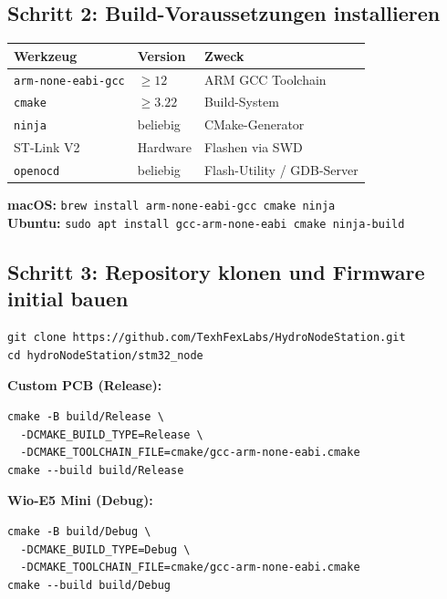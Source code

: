 \documentclass[11pt,a4paper]{scrartcl}
\begin{document}
\subsection*{Schritt 2: Build-Voraussetzungen installieren}

\begin{table}[H]
  \centering
  \begin{tabular}{lll}
    \hline
    \textbf{Werkzeug} & \textbf{Version} & \textbf{Zweck} \\
    \hline
    \texttt{arm-none-eabi-gcc} & $\geq 12$ & ARM GCC Toolchain \\
    \texttt{cmake}             & $\geq 3.22$ & Build-System \\
    \texttt{ninja}             & beliebig & CMake-Generator \\
    ST-Link V2                 & Hardware & Flashen via SWD \\
    \texttt{openocd}           & beliebig & Flash-Utility / GDB-Server \\
    \hline
  \end{tabular}
\end{table}

\textbf{macOS:} \quad\texttt{brew install arm-none-eabi-gcc cmake ninja}\\
\textbf{Ubuntu:} \quad\texttt{sudo apt install gcc-arm-none-eabi cmake ninja-build}

\subsection*{Schritt 3: Repository klonen und Firmware initial bauen}

\begin{verbatim}
git clone https://github.com/TexhFexLabs/HydroNodeStation.git
cd hydroNodeStation/stm32_node
\end{verbatim}

\textbf{Custom PCB (Release):}
\begin{verbatim}
cmake -B build/Release \
  -DCMAKE_BUILD_TYPE=Release \
  -DCMAKE_TOOLCHAIN_FILE=cmake/gcc-arm-none-eabi.cmake
cmake --build build/Release
\end{verbatim}

\textbf{Wio-E5 Mini (Debug):}
\begin{verbatim}
cmake -B build/Debug \
  -DCMAKE_BUILD_TYPE=Debug \
  -DCMAKE_TOOLCHAIN_FILE=cmake/gcc-arm-none-eabi.cmake
cmake --build build/Debug
\end{verbatim}
\end{document}
